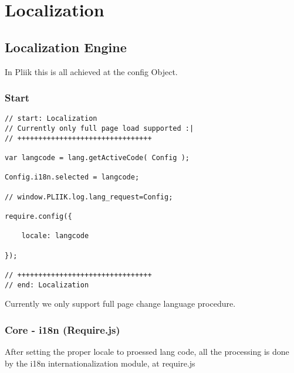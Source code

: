 
\section{Localization}


\subsection{Localization Engine}

In Pliik this is all achieved at the config Object.

\subsubsection{Start}

%    

\begin{lstlisting}[caption='app/js/config.js']
// start: Localization
// Currently only full page load supported :|
// ++++++++++++++++++++++++++++++++

var langcode = lang.getActiveCode( Config );

Config.i18n.selected = langcode;

// window.PLIIK.log.lang_request=Config;

require.config({

    locale: langcode

}); 

// ++++++++++++++++++++++++++++++++ 
// end: Localization

\end{lstlisting}


Currently we only support full page change language procedure. \\

\subsubsection{Core - i18n (Require.js)}

After setting the proper locale to proessed lang code, 
all the processing is done by the i18n internationalization module,
at require.js

